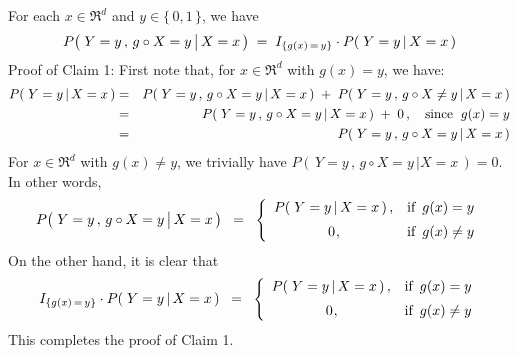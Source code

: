 For each $x \in \Re^{d}$ and $y \in \{\,0,1\,\}$, we have
\begin{equation*}
P\!\left(\,\left. Y = y \,,\, \overset{{\color{white}.}}{g} \circ X = y \,\right\vert X = x \,\right)
\;=\;
I_{\{g(x)\,=\,y\}} \cdot P\!\left(\,\left. Y = y \,\right\vert X = x \,\right)
\end{equation*}
Proof of Claim 1:\;
First note that, for $x \in \Re^{d}$ with $g(x) = y$, we have:
\begin{eqnarray*}
P\!\left(\,\left. Y = y \,\right\vert X = x \,\right)
& = &
	P\!\left(\,\left. Y = y\,,\, g \circ X = y \,\right\vert X = x \,\right)
	\; + \;
	P\!\left(\,\left. Y = y\,,\, g \circ X \neq y \,\right\vert X = x \,\right)
\\
& = &
	P\!\left(\,\left. Y = y\,,\, g \circ X = y \,\right\vert X = x \,\right)
	\; + \;
	0\,,
	\quad
	\textnormal{since \;$g(x) = y$}
\\
& = &
	P\!\left(\,\left. Y = y\,,\, g \circ X = y \,\right\vert X = x \,\right)
\end{eqnarray*}
For $x \in \Re^{d}$ with $g(x) \neq y$, we trivially have
$P\!\left(\,\left. Y = y\,,\, g \circ X = y \,\right\vert X = x \,\right) = 0$.
In other words,
\begin{equation*}
P\!\left(\,\left. Y = y \,,\, \overset{{\color{white}.}}{g} \circ X = y \,\right\vert X = x \,\right)
\;\; = \;\;
	\left\{\begin{array}{cl}
	P\!\left(\,\left. Y = y \,\right\vert X = x \,\right), & \textnormal{if \,$g(x) = y$}
	\\
	\overset{{\color{white}-}}{0}, & \textnormal{if \,$g(x) \neq y$}
	\end{array}\right.
\end{equation*}
On the other hand, it is clear that
\begin{equation*}
I_{\{g(x)\,=\,y\}} \cdot P\!\left(\,\left. Y = y \,\right\vert X = x \,\right)
\;\; = \;\;
	\left\{\begin{array}{cl}
	P\!\left(\,\left. Y = y \,\right\vert X = x \,\right), & \textnormal{if \,$g(x) = y$}
	\\
	\overset{{\color{white}-}}{0}, & \textnormal{if \,$g(x) \neq y$}
	\end{array}\right.
\end{equation*}
This completes the proof of Claim 1.

